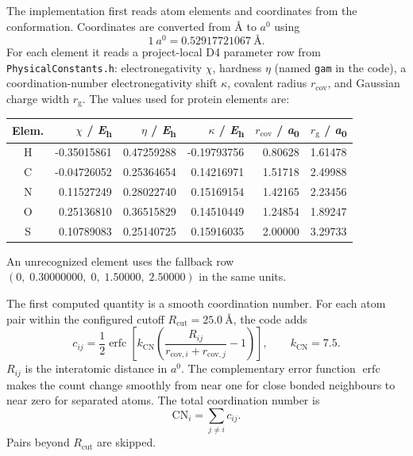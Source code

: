 \documentclass[11pt]{article}
\begin{document}
The implementation first reads atom elements and coordinates from the
conformation. Coordinates are converted from \(\si{\angstrom}\) to \(\si{\bohr}\)
using
\[
  \SI{1}{\bohr}=\SI{0.52917721067}{\angstrom}.
\]
For each element it reads a project-local D4 parameter row from
\texttt{PhysicalConstants.h}: electronegativity \(\chi\), hardness
\(\eta\) (named \texttt{gam} in the code), a coordination-number
electronegativity shift \(\kappa\), covalent radius \(r_{\mathrm{cov}}\), and
Gaussian charge width \(r_{\mathrm{g}}\). The values used for protein elements
are:
\begin{center}
\small
\begin{tabular}{crrrrr}
\hline
Elem. & \(\chi\) / \si{\hartree} & \(\eta\) / \si{\hartree}
& \(\kappa\) / \si{\hartree} & \(r_{\mathrm{cov}}\) / \si{\bohr}
& \(r_{\mathrm{g}}\) / \si{\bohr} \\
\hline
H & -0.35015861 & 0.47259288 & -0.19793756 & 0.80628 & 1.61478\\
C & -0.04726052 & 0.25364654 &  0.14216971 & 1.51718 & 2.49988\\
N &  0.11527249 & 0.28022740 &  0.15169154 & 1.42165 & 2.23456\\
O &  0.25136810 & 0.36515829 &  0.14510449 & 1.24854 & 1.89247\\
S &  0.10789083 & 0.25140725 &  0.15916035 & 2.00000 & 3.29733\\
\hline
\end{tabular}
\end{center}
An unrecognized element uses the fallback row
\((0,\;0.30000000,\;0,\;1.50000,\;2.50000)\) in the same units.

The first computed quantity is a smooth coordination number. For each atom pair
within the configured cutoff \(R_{\mathrm{cut}}=\SI{25.0}{\angstrom}\), the code
adds
\begin{equation}
  c_{ij} =
  \frac{1}{2}\operatorname{erfc}
  \left[
    k_{\mathrm{CN}}
    \left(
      \frac{R_{ij}}{r_{\mathrm{cov},i}+r_{\mathrm{cov},j}} - 1
    \right)
  \right],
  \qquad k_{\mathrm{CN}}=7.5 .
  \label{eq:cnpair}
\end{equation}
\(R_{ij}\) is the interatomic distance in \(\si{\bohr}\). The complementary
error function \(\operatorname{erfc}\) makes the count change smoothly from near
one for close bonded neighbours to near zero for separated atoms. The total
coordination number is
\begin{equation}
  \mathrm{CN}_i = \sum_{j\ne i} c_{ij}.
  \label{eq:cn}
\end{equation}
Pairs beyond \(R_{\mathrm{cut}}\) are skipped.
\end{document}

